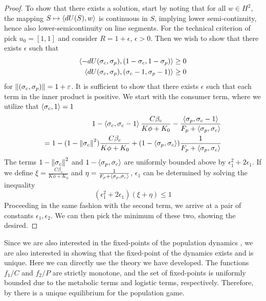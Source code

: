 \begin{proof}
  To show that there exists a solution, start by noting that for all $w\in H^2$, the mapping $S \mapsto \left \langle dU(S),w \right \rangle$ is continuous in $S$, implying lower semi-continuity, hence also lower-semicontinuity on line segments.
  For the technical criterion of  pick $u_0 = [1,1]$ and consider $R=1+\epsilon$, $\epsilon>0$. Then we wish to show that there exists $\epsilon$ such that
  \begin{equation}
    \begin{split}
    \left \langle -dU(\sigma_c,\sigma_p),(1-\sigma_c, 1-\sigma_p) \right \rangle \geq 0 \\
    \left \langle dU(\sigma_c,\sigma_p),(\sigma_c-1, \sigma_p-1) \right \rangle \geq 0
  \end{split}
  \end{equation}
  for $\left \Vert (\sigma_c,\sigma_p) \right \Vert = 1+\varepsilon$.
  It is sufficient to show that there exists $\epsilon$ such that each term in the inner product is positive. We start with the consumer term, where we utilize that $\left \langle \sigma_c,1 \right \rangle=1$
  \begin{equation}
    \begin{split}
    1-\ip{\sigma_c}{\sigma_c-1}\frac{ C \beta_c }{K\phi + K_0} - \frac{\ip{\sigma_p}{\sigma_c-1}}{F_p + \ip{\sigma_p}{\sigma_c}} \\
     =1-(1-\norm{\sigma_c}^2)\frac{ C \beta_c }{K\phi + K_0}+(1-\ip{\sigma_p}{\sigma_c})\frac{1}{F_p + \ip{\sigma_p}{\sigma_c}}
  \end{split}
  \end{equation}
  The terms $1-\left \Vert \sigma_c \right \Vert^2$ and $1-\left \langle \sigma_p,\sigma_c \right \rangle$ are uniformly bounded above by $\epsilon_1^2+2\epsilon_1$. If we define $\xi = \frac{C \beta_c }{K\phi + K_0}$ and $\eta = \frac{1}{F_p + \left \langle \sigma_p,\sigma_c \right \rangle}$, $\epsilon_1$ can be determined by solving the inequality
  \begin{equation}
    (\epsilon_1^2+2\epsilon_1)(\xi+\eta) \leq 1
  \end{equation}
  Proceeding in the same fashion with the second term, we arrive at a pair of constants $\epsilon_1,\epsilon_2$. We can then pick the minimum of these two, showing the desired.
\end{proof}
Since we are also interested in the fixed-points of the population dynamics , we are also interested in showing that the fixed-point of the dynamics exists and is unique. Here we can directly use the theory we have developed.  The functions $f_1/C$ and $f_2/P$ are strictly monotone, and the set of fixed-points is uniformly bounded due to the metabolic terms and logistic terms, respectively. Therefore, by  there is a unique equilibrium for the population game.


